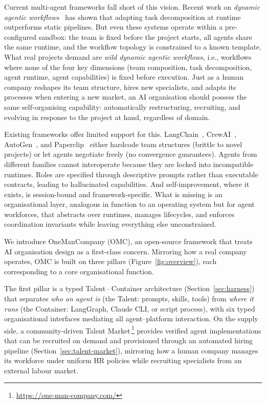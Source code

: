 \documentclass[11pt,a4paper]{article}
\begin{document}
Current multi-agent frameworks fall short of this vision.  Recent work on \emph{dynamic agentic workflows}~\cite{wang2025tdag, erdogan2025planact, hu2025evomac} has shown that adapting task decomposition at runtime outperforms static pipelines.  But even these systems operate within a pre-configured sandbox: the team is fixed before the project starts, all agents share the same runtime, and the workflow topology is constrained to a known template.  What real projects demand are \emph{wild dynamic agentic workflows}, i.e., workflows where none of the four key dimensions (team composition, task decomposition, agent runtime, agent capabilities) is fixed before execution.  Just as a human company reshapes its team structure, hires new specialists, and adapts its processes when entering a new market, an AI organisation should possess the same self-organising capability: automatically restructuring, recruiting, and evolving in response to the project at hand, regardless of domain.

Existing frameworks offer limited support for this.  LangChain~\cite{langchain2024deepagents}, CrewAI~\cite{crewai}, AutoGen~\cite{autogen}, and Paperclip~\cite{paperclip2025} either hardcode team structures (brittle to novel projects) or let agents negotiate freely (no convergence guarantees).  Agents from different families cannot interoperate because they are locked into incompatible runtimes.  Roles are specified through descriptive prompts rather than executable contracts, leading to hallucinated capabilities.  And self-improvement, where it exists, is session-bound and framework-specific.  What is missing is an organisational layer, analogous in function to an operating system but for agent workforces, that abstracts over runtimes, manages lifecycles, and enforces coordination invariants while leaving everything else unconstrained.

We introduce OneManCompany (OMC), an open-source framework that treats AI organisation design as a first-class concern.  Mirroring how a real company operates, OMC is built on three pillars (Figure~\ref{fig:overview}), each corresponding to a core organisational function.

The first pillar is a typed Talent\,--\,Container architecture (Section~\ref{sec:harness}) that separates \emph{who an agent is} (the Talent: prompts, skills, tools) from \emph{where it runs} (the Container: LangGraph, Claude CLI, or script process), with six typed organisational interfaces mediating all agent--platform interaction.  On the supply side, a community-driven Talent Market\,\footnote{\url{https://one-man-company.com/}} provides verified agent implementations that can be recruited on demand and provisioned through an automated hiring pipeline (Section~\ref{sec:talent-market}), mirroring how a human company manages its workforce under uniform HR policies while recruiting specialists from an external labour market.
\end{document}
